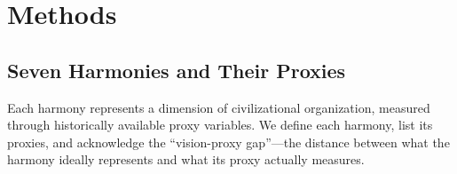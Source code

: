 \documentclass[10pt,letterpaper]{article}
\begin{document}
\section*{Methods}

\subsection*{Seven Harmonies and Their Proxies}

Each harmony represents a dimension of civilizational organization,
measured through historically available proxy variables. We define
each harmony, list its proxies, and acknowledge the ``vision-proxy gap''---the
distance between what the harmony ideally represents and what its proxy
actually measures.
\end{document}
